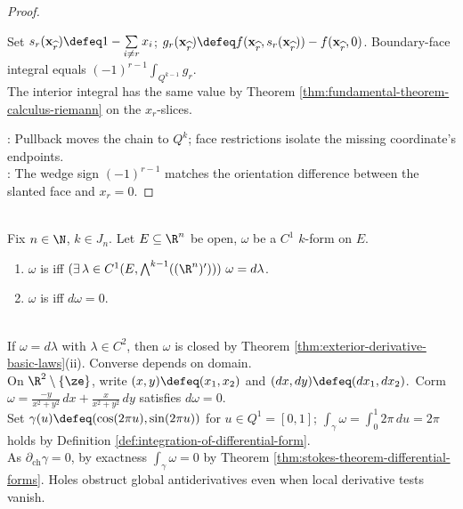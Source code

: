 \begin{theorem}
\begin{proof}
\begin{enumerate}[label=(\roman*)]
Set $s_r(\mathbf{x}_{\widehat r})\defeq1-\sum\limits_{i\neq r}x_i$; $g_r(\mathbf{x}_{\widehat r})\defeq f(\mathbf{x}_{\widehat r},s_r(\mathbf{x}_{\widehat r}))-f(\mathbf{x}_{\widehat r},0)$. Boundary-face integral equals $(-1)^{r-1}\int_{Q^{k-1}}g_r$.\\
The interior integral has the same value by Theorem \ref{thm:fundamental-theorem-calculus-riemann} on the $x_r$-slices.
\end{enumerate}
: Pullback moves the chain to $Q^k$; face restrictions isolate the missing coordinate's endpoints.\\
: The wedge sign $(-1)^{r-1}$ matches the orientation difference between the slanted face and $x_r=0$.
\end{proof}
\end{theorem}

\begin{definition} \label{def:closed-and-exact-forms} \\
Fix $n\in\N$, $k\in J_n$. Let $E\subseteq\R^n$ be open, $\omega$ be a $C^1$ $k$-form on $E$.
\begin{enumerate}[label=(\roman*)]
\setlength{\itemsep}{0pt}
\item $\omega$ is  iff $(\exists\,\lambda\in C^1(E,\bigwedge^{k-1}((\R^n)')))\ \omega=d\lambda$.
\item $\omega$ is  iff $d\omega=0$.
\end{enumerate}
\end{definition}

\begin{perspective} \label{per:closed-exact-local-global} \\
If $\omega=d\lambda$ with $\lambda\in C^2$, then $\omega$ is closed by Theorem \ref{thm:exterior-derivative-basic-laws}(ii). Converse depends on domain.\\
On $\R^2\setminus\{\ze\}$, write $(x,y)\defeq(x_1,x_2)$ and $(dx,dy)\defeq(dx_1,dx_2)$.\ Corm $\omega=\frac{-y}{x^2+y^2}\,dx+\frac{x}{x^2+y^2}\,dy$ satisfies $d\omega=0$.\\
Set $\gamma(u)\defeq(\cos(2\pi u),\sin(2\pi u))$ for $u\in Q^1=[0,1]$; $\int_\gamma\omega=\int_0^1 2\pi\,du=2\pi$ holds by Definition \ref{def:integration-of-differential-form}.\\
As $\partial_{\mathrm{ch}}\gamma=0$, by exactness $\int_\gamma\omega=0$ by Theorem \ref{thm:stokes-theorem-differential-forms}. Holes obstruct global antiderivatives even when local derivative tests vanish.
\end{perspective}

